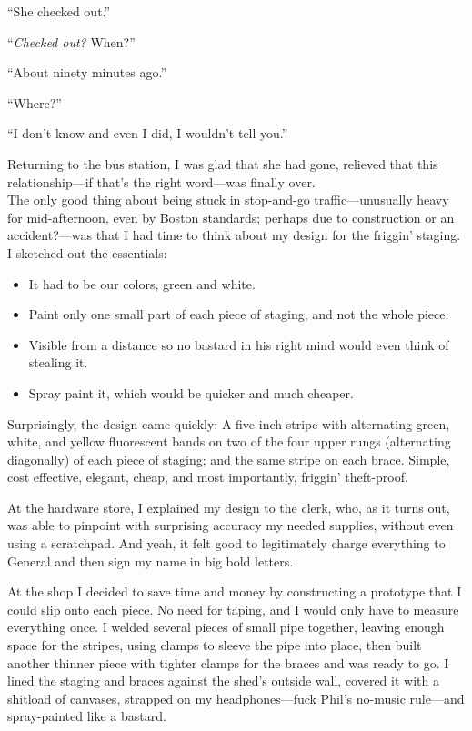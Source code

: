 ``She checked out.''

``\emph{Checked out?} When?''

``About ninety minutes ago.''

``Where?''

``I don't know and even I did, I wouldn't tell you.''

Returning to the bus station, I was glad that she had gone, relieved
that this relationship---if that's the right word---was finally over.\\

The only good thing about being stuck in stop-and-go traffic---unusually
heavy for mid-afternoon, even by Boston standards; perhaps due to
construction or an accident?---was that I had time to think about my
design for the friggin' staging. I sketched out the essentials:

\begin{itemize}
\tightlist
\item
  It had to be our colors, green and white.
\item
  Paint only one small part of each piece of staging, and not the whole
  piece.
\item
  Visible from a distance so no bastard in his right mind would even
  think of stealing it.
\item
  Spray paint it, which would be quicker and much cheaper.
\end{itemize}

Surprisingly, the design came quickly: A five-inch stripe with
alternating green, white, and yellow fluorescent bands on two of the
four upper rungs (alternating diagonally) of each piece of staging; and
the same stripe on each brace. Simple, cost effective, elegant, cheap,
and most importantly, friggin' theft-proof.

At the hardware store, I explained my design to the clerk, who, as it
turns out, was able to pinpoint with surprising accuracy my needed
supplies, without even using a scratchpad. And yeah, it felt good to
legitimately charge everything to General and then sign my name in big
bold letters.

At the shop I decided to save time and money by constructing a prototype
that I could slip onto each piece. No need for taping, and I would only
have to measure everything once. I welded several pieces of small pipe
together, leaving enough space for the stripes, using clamps to sleeve
the pipe into place, then built another thinner piece with tighter
clamps for the braces and was ready to go. I lined the staging and
braces against the shed's outside wall, covered it with a shitload of
canvases, strapped on my headphones---fuck Phil's no-music rule---and
spray-painted like a bastard.

